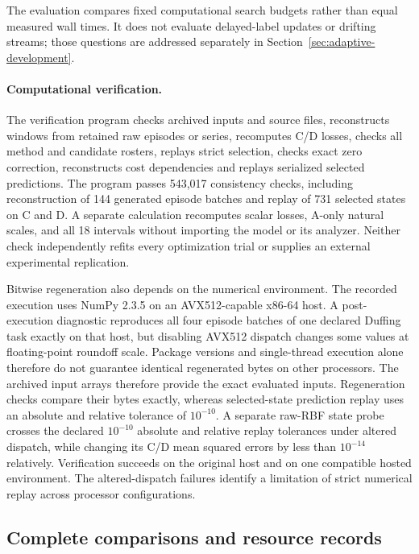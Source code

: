 The evaluation compares fixed computational search budgets rather than
equal measured wall times. It does not evaluate delayed-label updates
or drifting streams; those questions are addressed separately in
Section~\ref{sec:adaptive-development}.

\paragraph{Computational verification.}
The verification program checks archived inputs and source files, reconstructs
windows from retained raw episodes or series, recomputes C/D losses,
checks all method and candidate rosters, replays strict selection,
checks exact zero correction, reconstructs cost dependencies and
replays serialized selected predictions. The program passes 543,017 consistency checks, including reconstruction
of 144 generated episode batches and replay of 731 selected states on
C and D. A separate calculation recomputes scalar losses, A-only
natural scales, and all 18 intervals without importing the model or
its analyzer. Neither check independently refits every optimization
trial or supplies an external experimental replication.

Bitwise regeneration also depends on the numerical environment. The
recorded execution uses NumPy 2.3.5 on an AVX512-capable x86-64 host.
A post-execution diagnostic reproduces all four episode batches of one
declared Duffing task exactly on that host, but disabling AVX512 dispatch
changes some values at floating-point roundoff scale. Package versions
and single-thread execution alone therefore do not guarantee identical
regenerated bytes on other processors. The archived input arrays therefore provide the exact evaluated inputs.
Regeneration checks compare their bytes exactly, whereas selected-state
prediction replay uses an absolute and relative tolerance of $10^{-10}$.
A separate raw-RBF state probe crosses the declared $10^{-10}$ absolute
and relative replay tolerances under altered dispatch, while changing
its C/D mean squared errors by less than $10^{-14}$ relatively.
Verification succeeds on the original host and on one compatible hosted
environment. The altered-dispatch failures identify a limitation of
strict numerical replay across processor configurations.


\clearpage
\subsection{Complete comparisons and resource records}

